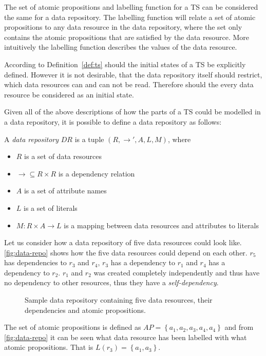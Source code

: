 The set of atomic propositions and labelling function for a TS can be considered the same for a data repository. The labelling function will relate a set of atomic propositions to any data resource in the data repository, where the set only contains the atomic propositions that are satisfied by the data resource. More intuitively the labelling function describes the values of the data resource.

According to Definition~\ref{def:ts} should the initial states of a TS be explicitly defined. However it is not desirable, that the data repository itself should restrict, which data resources can and can not be read. Therefore should the every data resource be considered as an initial state.

Given all of the above descriptions of how the parts of a TS could be modelled in a data repository, it is possible to define a data repository as follows:
\begin{definition}
A \emph{data repository} $DR$ is a tuple $\left(R, \longrightarrow', A, L, M \right)$, where
\begin{itemize}
  \item $R$ is a set of data resources
  \item $\longrightarrow \subseteq R \times R$ is a dependency relation
  \item $A$ is a set of attribute names
  \item $L$ is a set of literals
  \item $M : R \times A \rightarrow L$ is a mapping between data resources and attributes to literals
\end{itemize}
\end{definition}

\begin{example}\label{ex:data-repo}
Let us consider how a data repository of five data resources could look like. \autoref{fig:data-repo} shows how the five data resources could depend on each other. $r_5$ has dependencies to $r_3$ and $r_4$, $r_3$ has a dependency to $r_1$ and $r_4$ has a dependency to $r_2$. $r_1$ and $r_2$ was created completely independently and thus have no dependency to other resources, thus they have a \emph{self-dependency}.
\begin{figure}[!ht] 
    \begin{center}
        
        \caption{Sample data repository containing five data resources, their dependencies and atomic propositions.}
        \label{fig:data-repo}
    \end{center}
\end{figure}
The set of atomic propositions is defined as $AP = \left\{ a_1, a_2, a_3, a_4, a_4 \right\}$ and from \autoref{fig:data-repo} it can be seen what data resource has been labelled with what atomic propositions. That is $L(r_3) = \left\{ a_1, a_3 \right\}$.
\end{example}

